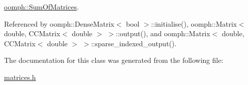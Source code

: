 \hyperlink{classoomph_1_1SumOfMatrices_af93e5663c282ab73bc01c8dff58d0e82}{oomph\+::\+Sum\+Of\+Matrices}.



Referenced by oomph\+::\+Dense\+Matrix$<$ bool $>$\+::initialise(), oomph\+::\+Matrix$<$ double, C\+C\+Matrix$<$ double $>$ $>$\+::output(), and oomph\+::\+Matrix$<$ double, C\+C\+Matrix$<$ double $>$ $>$\+::sparse\+\_\+indexed\+\_\+output().



The documentation for this class was generated from the following file\+:\begin{DoxyCompactItemize}
\item 
\hyperlink{matrices_8h}{matrices.\+h}\end{DoxyCompactItemize}
